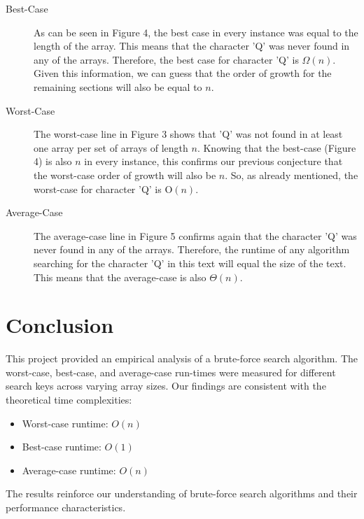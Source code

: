 \documentclass{article}
\begin{document}
\begin{description}
    \item[Best-Case] As can be seen in Figure 4, the best case in every instance was equal to the length of the array. This means that the character 'Q' was never found in any of the arrays. Therefore, the best case for character 'Q' is $\Omega(n)$. Given this information, we can guess that the order of growth for the remaining sections will also be equal to $n$.
    \item[Worst-Case] The worst-case line in Figure 3 shows that 'Q' was not found in at least one array per set of arrays of length $n$. Knowing that the best-case (Figure 4) is also $n$ in every instance, this confirms our previous conjecture that the worst-case order of growth will also be $n$. So, as already mentioned, the worst-case for character 'Q' is O$(n)$.
    \item[Average-Case] The average-case line in Figure 5 confirms again that the character 'Q' was never found in any of the arrays. Therefore, the runtime of any algorithm searching for the character 'Q' in this text will equal the size of the text. This means that the average-case is also $\Theta(n)$.
\end{description}
	
\section{Conclusion}
This project provided an empirical analysis of a brute-force search algorithm. The worst-case, best-case, and average-case run-times were measured for different search keys across varying array sizes. Our findings are consistent with the theoretical time complexities:
	
    \begin{itemize}
        \item Worst-case runtime: \( O(n) \)
	\item Best-case runtime: \( O(1) \)
	\item Average-case runtime: \( O(n) \)
    \end{itemize}
The results reinforce our understanding of brute-force search algorithms and their performance characteristics.
\end{document}
